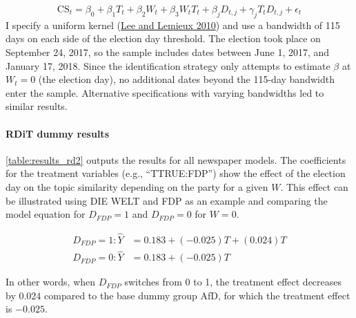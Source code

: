 \documentclass[
  12pt,
]{article}
\begin{document}
\[
\text{CS}_{t}=\beta_0+\beta_1T_t+\beta_2W_{t}+\beta_3W_tT_t+\beta_jD_{t,j}+\gamma_jT_tD_{t,j}+ \epsilon_t
\] I specify a uniform kernel
(\protect\hyperlink{ref-lee_regression_2010}{Lee and Lemieux 2010}) and
use a bandwidth of 115 days on each side of the election day threshold.
The election took place on September 24, 2017, so the sample includes
dates between June 1, 2017, and January 17, 2018. Since the
identification strategy only attempts to estimate \(\beta\) at \(W_t=0\)
(the election day), no additional dates beyond the 115-day bandwidth
enter the sample. Alternative specifications with varying bandwidths led
to similar results.

\hypertarget{rdit-dummy-results}{%
\paragraph{RDiT dummy results}\label{rdit-dummy-results}}

\autoref{table:results_rd2} outputs the results for all newspaper
models. The coefficients for the treatment variables (e.g.,
``TTRUE:FDP'') show the effect of the election day on the topic
similarity depending on the party for a given \(W\). This effect can be
illustrated using DIE WELT and FDP as an example and comparing the model
equation for \(D_{FDP} = 1\) and \(D_{FDP} = 0\) for \(W=0\).

\[
\begin{aligned}
D_{FDP} = 1: \hat{Y} &=0.183+(-0.025)T+(0.024)T \\
D_{FDP} = 0: \hat{Y} &=0.183+(-0.025)T
\end{aligned}
\]

In other words, when \(D_{FDP}\) switches from 0 to 1, the treatment
effect decreases by \(0.024\) compared to the base dummy group AfD, for
which the treatment effect is \(-0.025\).
\end{document}
